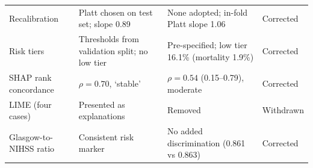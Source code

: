 \begin{table}[htbp]
\begin{tabular}{>{\raggedright\arraybackslash}p{3.6cm}>{\raggedright\arraybackslash}p{3.3cm}>{\raggedright\arraybackslash}p{4.3cm}>{\raggedright\arraybackslash}p{2.2cm}}
Recalibration & Platt chosen on test set; slope 0.89 & None adopted; in-fold Platt slope 1.06 & Corrected \\
Risk tiers & Thresholds from validation split; no low tier & Pre-specified; low tier 16.1\% (mortality 1.9\%) & Corrected \\
SHAP rank concordance & $\rho=0.70$, `stable' & $\rho=0.54$ (0.15--0.79), moderate & Corrected \\
LIME (four cases) & Presented as explanations & Removed & Withdrawn \\
Glasgow-to-NIHSS ratio & Consistent risk marker & No added discrimination (0.861 vs 0.863) & Corrected \\
\bottomrule
\end{tabular}
\end{table}
